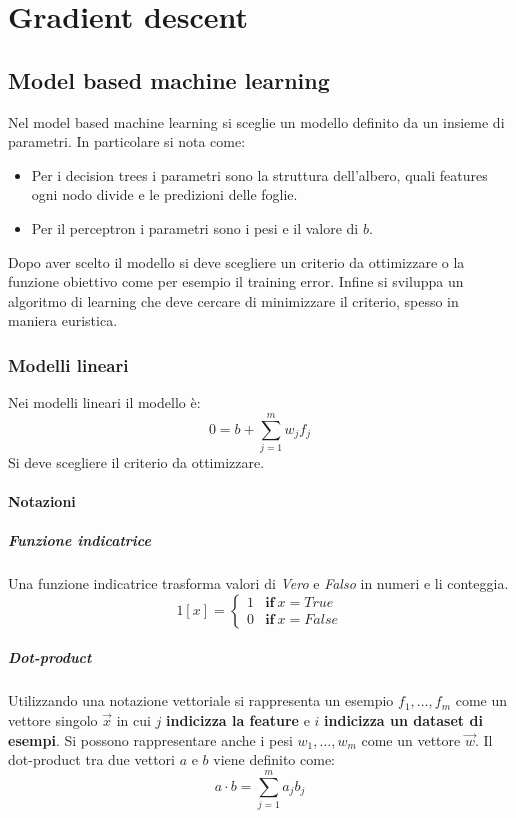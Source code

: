 \chapter{Gradient descent}

\section{Model based machine learning}
Nel model based machine learning si sceglie un modello definito da un insieme di parametri.
In particolare si nota come:
\begin{multicols}{2}
	\begin{itemize}
		\item Per i decision trees i parametri sono la struttura dell'albero, quali features ogni nodo divide e le predizioni delle foglie.
		\item Per il perceptron i parametri sono i pesi e il valore di $b$.
	\end{itemize}
\end{multicols}
Dopo aver scelto il modello si deve scegliere un criterio da ottimizzare o la funzione obiettivo come per esempio il training error.
Infine si sviluppa un algoritmo di learning che deve cercare di minimizzare il criterio, spesso in maniera euristica.

	\subsection{Modelli lineari}
	Nei modelli lineari il modello \`e:
	$$0=b+\sum\limits_{j=1}^mw_jf_j$$
	Si deve scegliere il criterio da ottimizzare.

		\subsubsection{Notazioni}

			\paragraph{Funzione indicatrice}
			Una funzione indicatrice trasforma valori di \emph{Vero} e \emph{Falso} in numeri e li conteggia.
			$$1[x]=\begin{cases}1&\mathbf{if}\ x = True\\
										  	0&\textbf{if}\ x = False
				 	\end{cases}$$

			\paragraph{Dot-product}
			Utilizzando una notazione vettoriale si rappresenta un esempio $f_1,\dots,f_m$ come un vettore singolo $\overrightarrow{x}$ in cui $j$ \textbf{indicizza la feature} e $i$ \textbf{indicizza un dataset di esempi}.
			Si possono rappresentare anche i pesi $w_1,\dots,w_m$ come un vettore $\overrightarrow{w}$.
			Il dot-product tra due vettori $a$ e $b$ viene definito come:
			$$a\cdot b = \sum\limits_{j=1}^ma_jb_j$$

